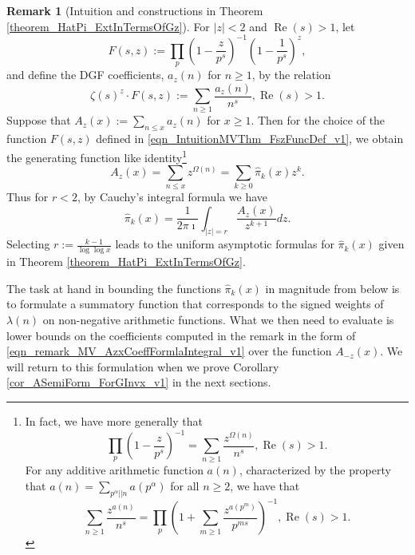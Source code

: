 \documentclass[11pt,reqno,a4letter]{article}
\numberwithin{figure}{section}
\numberwithin{table}{section}
\newcommand{\cf}{\textit{cf.\ }}
\theoremstyle{plain}
\numberwithin{theorem}{section}
\theoremstyle{definition}
\newtheorem{remark}[theorem]{Remark}
\renewcommand{\Re}{\operatorname{Re}}
\begin{document}
\begin{remark}[Intuition and constructions in Theorem \ref{theorem_HatPi_ExtInTermsOfGz}] 
\label{remark_intuitionConstrIn_theorem_HatPi_ExtInTermsOfGz} 
For $|z| < 2$ and $\Re(s) > 1$, let 
\begin{equation} 
\label{eqn_IntuitionMVThm_FszFuncDef_v1} 
F(s, z) := \prod_{p} \left(1 - \frac{z}{p^s}\right)^{-1} \left(1 - \frac{1}{p^s}\right)^{z}, 
\end{equation} 
and define the DGF coefficients, $a_z(n)$ for $n \geq 1$, by the relation 
\[
\zeta(s)^{z} \cdot F(s, z) := \sum_{n \geq 1} \frac{a_z(n)}{n^s}, \Re(s) > 1. 
\]
Suppose that $A_z(x) := \sum_{n \leq x} a_z(n)$ for $x \geq 1$. Then for the choice of the 
function $F(s, z)$ defined in \eqref{eqn_IntuitionMVThm_FszFuncDef_v1}, we obtain the 
generating function like identity\footnote{ 
     In fact, we have more generally that 
     \[
     \prod_p \left(1 - \frac{z}{p^s}\right)^{-1} = \sum_{n \geq 1} \frac{z^{\Omega(n)}}{n^s}, 
          \Re(s) > 1.  
     \]
     For any additive arithmetic function $a(n)$, 
     characterized by the property that 
     $a(n) = \sum_{p^{\alpha} || n} a(p^{\alpha})$ for all $n \geq 2$, we have that 
     \cite[\cf \S 1.7]{IWANIEC-KOWALSKI} 
     \[
     \sum_{n \geq 1} \frac{z^{a(n)}}{n^s} = \prod_p \left( 
          1 + \sum_{m \geq 1} \frac{z^{a(p^m)}}{p^{ms}}\right)^{-1}, \Re(s) > 1. 
     \]
}
\begin{equation} 
\label{eqn_remark_MV_AzxCoeffFormlaIntegral_v1} 
A_z(x) = \sum_{n \leq x} z^{\Omega(n)} = \sum_{k \geq 0} \widehat{\pi}_k(x) z^k. 
\end{equation} 
Thus for $r < 2$, by Cauchy's integral formula we have 
\[
\widehat{\pi}_k(x) = \frac{1}{2\pi\imath} \int_{|z|=r} \frac{A_z(x)}{z^{k+1}} dz. 
\]
Selecting $r := \frac{k-1}{\log\log x}$ leads to the uniform asymptotic formulas for 
$\widehat{\pi}_k(x)$ given in 
Theorem \ref{theorem_HatPi_ExtInTermsOfGz}. 
\end{remark} 

The task at hand in bounding the functions $\widehat{\pi}_k(x)$ in magnitude from below is 
to formulate a summatory function that corresponds to the signed weights of $\lambda(n)$ on 
non-negative arithmetic functions. What we then need to evaluate is lower bounds on the 
coefficients computed in the remark in the form of \eqref{eqn_remark_MV_AzxCoeffFormlaIntegral_v1} 
over the function $A_{-z}(x)$. 
We will return to this formulation when we prove 
Corollary \ref{cor_ASemiForm_ForGInvx_v1} in the next sections. 
\end{document}
